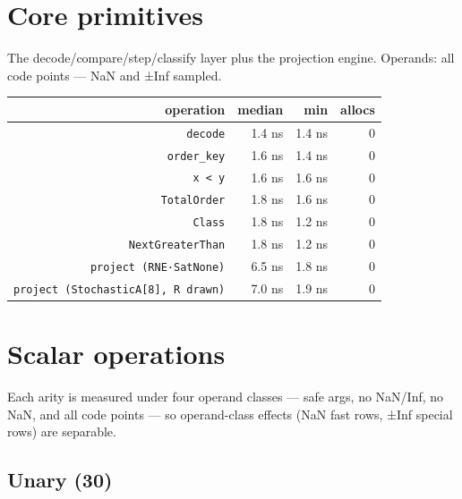 \section{Core primitives}



\label{10766655646123147915}{}


The decode/compare/step/classify layer plus the projection engine. Operands: all code points — NaN and ±Inf sampled.




\begin{table}[h]
\centering
\begin{tabulary}{\linewidth}{R R R R}
\toprule
operation & median & min & allocs \\
\toprule
\texttt{decode} & 1.4 ns & 1.4 ns & 0 \\
\texttt{order\_key} & 1.6 ns & 1.4 ns & 0 \\
\texttt{x < y} & 1.6 ns & 1.6 ns & 0 \\
\texttt{TotalOrder} & 1.8 ns & 1.6 ns & 0 \\
\texttt{Class} & 1.8 ns & 1.2 ns & 0 \\
\texttt{NextGreaterThan} & 1.8 ns & 1.2 ns & 0 \\
\texttt{project (RNE·SatNone)} & 6.5 ns & 1.8 ns & 0 \\
\texttt{project (StochasticA[8], R drawn)} & 7.0 ns & 1.9 ns & 0 \\
\bottomrule
\end{tabulary}

\end{table}



\section{Scalar operations}



\label{11509067801894334317}{}


Each arity is measured under four operand classes — safe args, no NaN/Inf, no NaN, and all code points — so operand-class effects (NaN fast rows, ±Inf special rows) are separable.




\clearpage



\subsection{Unary (30)}



